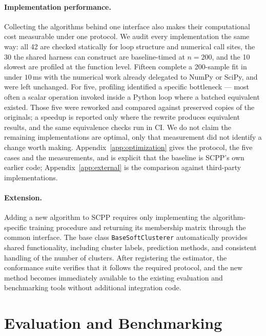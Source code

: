 \documentclass[twoside,11pt]{article}
\begin{document}
\paragraph{Implementation performance.}
Collecting the algorithms behind one interface also makes their computational
cost measurable under one protocol. We audit every implementation the same
way: all 42 are checked statically for loop structure and numerical call
sites, the 30 the shared harness can construct are baseline-timed at
$n = 200$, and the 10 slowest are profiled at the function level. Fifteen
complete a 200-sample fit in under $10$\,ms with the numerical work already
delegated to NumPy or SciPy, and were left unchanged. For five, profiling
identified a specific bottleneck --- most often a scalar operation invoked
inside a Python loop where a batched equivalent existed. Those five were
reworked and compared against preserved copies of the originals; a speedup is
reported only where the rewrite produces equivalent results, and the same
equivalence checks run in CI. We do not claim the remaining implementations
are optimal, only that measurement did not identify a change worth making.
Appendix~\ref{app:optimization} gives the protocol, the five cases and the
measurements, and is explicit that the baseline is SCPP's own earlier code;
Appendix~\ref{app:external} is the comparison against third-party
implementations.

\paragraph{Extension.}
Adding a new algorithm to SCPP requires only implementing the algorithm-specific
training procedure and returning its membership matrix through the common
interface. The base class \texttt{BaseSoftClusterer} automatically provides shared functionality, including
cluster labels, prediction methods, and consistent handling of the number of
clusters. After registering the estimator, the conformance suite verifies that
it follows the required protocol, and the new method becomes immediately
available to the existing evaluation and benchmarking tools without additional
integration code.

\section{Evaluation and Benchmarking}
\label{sec:benchmark}
\end{document}
